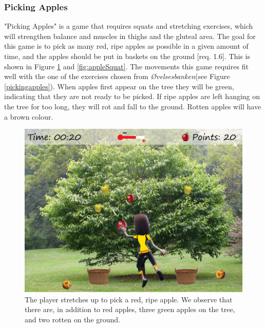 \subsubsection{Picking Apples}
"Picking Apples" is a game that requires squats and stretching exercises, which will strengthen balance and muscles in thighs and the gluteal area. The goal for this game is to pick as many red, ripe apples as possible in a given amount of time, and the apples should be put in baskets on the ground [req. 1.6]. This is shown in Figure \ref{fig:appleStretch} and \ref{fig:appleSquat}. The movements this game requires fit well with the one of the exercises chosen from \emph{Øvelsesbanken}(see Figure \ref{pickingapples}). When apples first appear on the tree they will be green, indicating that they are not ready to be picked. If ripe apples are left hanging on the tree for too long, they will rot and fall to the ground. Rotten apples will have a brown colour. 

\begin{figure} [H]
\centering
\includegraphics[scale=0.07]{gameappletreeEng.jpg}
\caption[Picking apples - stretching]{The player stretches up to pick a red, ripe apple. We observe that there are, in addition to red apples, three green apples on the tree, and two rotten on the ground.}
\label{fig:appleStretch}
\end{figure}

